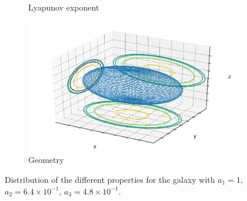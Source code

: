 \begin{figure}[h]
\begin{subfigure}[t]{0.4\textwidth}
        \caption{Lyapunov exponent}
    \end{subfigure}
    \begin{subfigure}[t]{0.4\textwidth}
        \includegraphics[width=\textwidth]{"../Files/Week 13/images/5_ellipsoid"}
        \caption{Geometry}
    \end{subfigure}
    \caption{Distribution of the different properties for the galaxy with $a_1 = 1$, $a_2 = 6.4\times10^{-1}$, $a_3 = 4.8\times10^{-1}$.}
    \label{fig: g10}
\end{figure}


